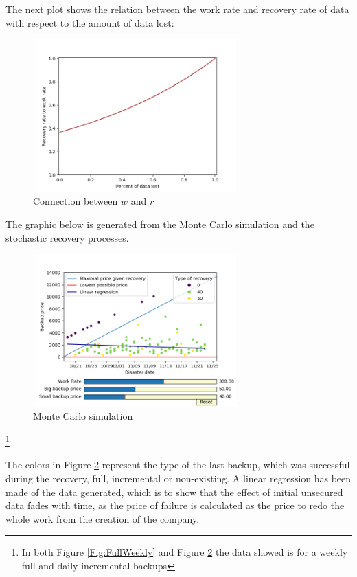 \documentclass[11pt, a4paper]{article}
\theoremstyle{definition}
\newcommand\blfootnote[1]{%
	\begingroup
	\renewcommand\thefootnote{}\footnote{#1}%
	\addtocounter{footnote}{-1}%
	\endgroup
}
\begin{document}
The next plot shows the relation between the work rate and recovery rate of data with respect to the amount of data lost:
\begin{figure}[H]
	\begin{minipage}{1.0\textwidth}
		\centering
		\includegraphics[width=0.7\textwidth]{Recovery_rate.png}
		\caption{Connection between $w$ and $r$}\label{Fig:Rec_rate}
	\end{minipage}
\end{figure}
The graphic below is generated from the Monte Carlo simulation and the stochastic recovery processes.
\begin{figure}[H]
	\begin{minipage}{1.0\textwidth}
		\centering
		\includegraphics[width=0.7\textwidth]{Weekly_full_carlo.png}
		\caption{Monte Carlo simulation}\label{Fig:MonteCarlo}
	\end{minipage}
\end{figure}
\blfootnote{In both Figure \ref{Fig:FullWeekly} and Figure \ref{Fig:MonteCarlo} the data showed is for a weekly full and daily incremental backups}
The colors in Figure \ref{Fig:MonteCarlo} represent the type of the last backup, which was successful during the recovery, full, incremental or non-existing. A linear regression has been made of the data generated, which is to show that the effect of initial unsecured data fades with time, as the price of failure is calculated as the price to redo the whole work from the creation of the company.\par
\end{document}
